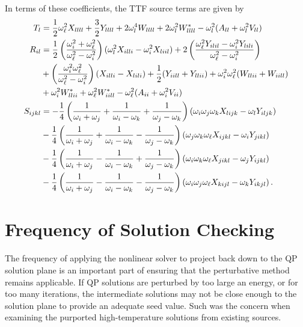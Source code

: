 \documentclass[../PhD.tex]{subfiles}
\begin{document}
\begin{subappendices}
In terms of these coefficients, the TTF source terms are given by
\begin{align}
\label{T calc}
T_l &= \frac{1}{2} \omega_\ell^2 X_{llll} + \frac{3}{2} Y_{llll} + 2\omega_l^4 W_{llll} + 2\omega_l^2 W^*_{llll} - \omega_l^2 (A_{ll} + \omega_l^2 V_{ll} ) \\
\label{R calc}
R_{il} &=\frac{1}{2} \left(\frac{\omega_i^2 + \omega_\ell^2}{\omega_\ell^2 - \omega_i^2}\right) (\omega_l^2 X_{illi} - \omega_i^2 X_{liil}) + 2\left(\frac{\omega_\ell^2 Y_{ilil} - \omega_i^2 Y_{lili}}{\omega_\ell^2 - \omega_i^2} \right) \nonumber \\
&+ \left(\frac{\omega_i^2 \omega_\ell^2}{\omega_\ell^2 - \omega_i^2}\right) (X_{illi} - X_{lili}) + \frac{1}{2} (Y_{iill} + Y_{llii}) + \omega_i^2 \omega_\ell^2 (W_{llii} + W_{iill}) \nonumber \\
&+ \omega_i^2 W^*_{llii} + \omega_\ell^2 W^*_{iill} - \omega_\ell^2 (A_{ii} + \omega_i^2 V_{ii} ) \\
\label{S calc}
S_{ijkl} &= -\frac{1}{4} \left( \frac{1}{\omega_i + \omega_j} + \frac{1}{\omega_i - \omega_k} + \frac{1}{\omega_j - \omega_k} \right) (\omega_i \omega_j \omega_k X_{lijk} - \omega_l Y_{iljk}) \nonumber \\
& - \frac{1}{4} \left( \frac{1}{\omega_i + \omega_j} +\frac{1}{\omega_i - \omega_k} - \frac{1}{\omega_j - \omega_k} \right) (\omega_j \omega_k \omega_\ell X_{ijkl} - \omega_i Y_{jikl} ) \nonumber \\
& -\frac{1}{4} \left( \frac{1}{\omega_i + \omega_j} - \frac{1}{\omega_i - \omega_k} + \frac{1}{\omega_j -\omega_k} \right) (\omega_i \omega_k \omega_\ell X_{jikl} - \omega_j Y_{ijkl} ) \nonumber \\
& -\frac{1}{4} \left( \frac{1}{\omega_i + \omega_j} - \frac{1}{\omega_i - \omega_k} - \frac{1}{\omega_j - \omega_k} \right) (\omega_i \omega_j \omega_\ell X_{kijl} - \omega_k Y_{ikjl}) \, .
\end{align}




\section{Frequency of Solution Checking}
\label{app: reop freq}

The frequency of applying the nonlinear solver to project back down to the QP solution plane is an important part of ensuring that the perturbative method remains applicable. If QP solutions are perturbed by too large an energy, or for too many iterations, the intermediate solutions may not be close enough to the solution plane to provide an adequate seed value. Such was the concern when examining the purported high-temperature solutions from existing sources.


\end{subappendices}
\end{document}
